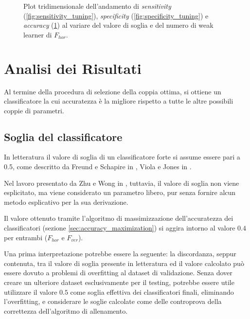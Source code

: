 \begin{figure}
\begin{subfigure}[b]{0.9\textwidth}
                    \caption{}
                    \label{fig:accuracy_tuning}
                \end{subfigure}
                \caption{Plot tridimensionale dell'andamento di \emph{sensitivity} (\ref{fig:sensitivity_tuning}), \emph{specificity} (\ref{fig:specificity_tuning}) e \emph{accuracy} (\ref{fig:accuracy_tuning}) al variare del valore di soglia e del numero di weak learner di $F_{hor}$.}
                \label{fig:performance_evaluation}
            \end{figure}

    \section{Analisi dei Risultati} %
    \label{sec:analisi_dei_risultati}
        Al termine della procedura di selezione della coppia ottima, si ottiene un classificatore la cui accuratezza è la migliore rispetto a tutte le altre possibili coppie di parametri.

            \subsection{Soglia del classificatore} %
            \label{sub:soglia_del_classificatore}            
                In letteratura il valore di soglia di un classificatore forte si assume essere pari a 0.5, come descritto da Freund e Schapire in \cite{Freund97}, Viola e Jones in \cite{Viola04}.

                Nel lavoro presentato da Zhu e Wong in \cite{Zhu13}, tuttavia, il valore di soglia non viene esplicitato, ma viene considerato un parametro libero, pur senza fornire alcun metodo esplicativo per la sua derivazione.

                Il valore ottenuto tramite l'algoritmo di massimizzazione dell'accuratezza dei classificatori (sezione \ref{sec:accuracy_maximization}) si aggira intorno al valore $0.4$ per entrambi ($F_{hor}$ e $F_{ver}$).
                
                Una prima interpretazione potrebbe essere la seguente: la discordanza, seppur contenuta, tra il valore di soglia presente in letteratura ed il valore calcolato può essere dovuto a problemi di overfitting al dataset di validazione.
                Senza dover creare un ulteriore dataset esclusivamente per il testing, potrebbe essere utile utilizzare il valore $0.5$ come soglia effettiva dei classificatori finali, eliminando l'overfitting, e considerare le soglie calcolate come delle controprova della correttezza dell'algoritmo di allenamento.

